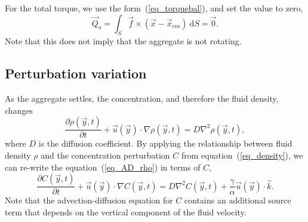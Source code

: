 For the total torque, we use the form~(\ref{eq_torquebal}), and set the value to zero,
\begin{equation}
	\vec{Q}_o =\int_S \vec{f}\times (\vec{x} - \vec{x}_{cm}) \ \textrm{d}S =  \vec{0}.
\label{eq_Qo}
\end{equation}
 Note that this does not imply that the aggregate is not rotating. 
\subsection{Perturbation variation}
As the aggregate settles, the concentration, and therefore the fluid density, changes
\begin{equation}
	\frac{\partial \rho(\vec{y},t)}{\partial t}
	+ \vec{u}(\vec{y}) \cdot \nabla \rho(\vec{y},t)
	 = D \nabla^2 \rho(\vec{y},t),
\label{eq_AD_rho}
\end{equation}
where $D$ is the diffusion coefficient.
By applying the relationship between fluid density $\rho$ and the concentration perturbation $C$ from equation~(\ref{eq_density}), we can re-write the equation~(\ref{eq_AD_rho}) in terms of $C$, 
\begin{equation}
	\frac{\partial C(\vec{y},t)}{\partial t}
	+ \vec{u}(\vec{y}) \cdot \nabla C(\vec{y},t)
	 = D \nabla^2 C(\vec{y},t)
	 + \frac{\gamma}{\alpha}\vec{u}(\vec{y})  \cdot \hat{k}.
\label{eq_AD_C}
\end{equation}
Note that the advection-diffusion equation for $C$ contains an additional source term that
depends on the vertical component of the fluid velocity.

